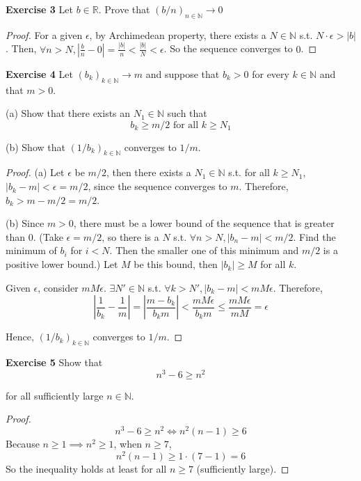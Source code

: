 \documentclass[12pt]{article}
\newcommand{\bbN}{\mathbb{N}}
\theoremstyle{definition}
\numberwithin{equation}{subsection}
\begin{document}
\textbf{Exercise 3} Let $b \in \mathbb{R} .$ Prove that $(b / n)_{n \in \mathbb{N}} \rightarrow 0$
\begin{proof}
For a given $\epsilon$, by Archimedean property, there exists a $N \in \bbN$ s.t. $N\cdot\epsilon > |b|$. Then, $\forall n > N, \left|\frac{b}{n} - 0\right|  = \frac{|b|}{n} < \frac{|b|}{N} < \epsilon$. So the sequence converges to $0$. 
\end{proof}


\textbf{Exercise 4} Let $\left(b_{k}\right)_{k \in \mathbb{N}} \rightarrow m$ and suppose that $b_{k}>0$ for every $k \in \mathbb{N}$ and that $m>0 .$

(a) Show that there exists an $N_{1} \in \mathbb{N}$ such that
$$
b_{k} \geq m / 2 \text { for all } k \geq N_{1}
$$

(b) Show that $\left(1 / b_{k}\right)_{k \in \mathbb{N}}$ converges to $1 / m$.
\begin{proof}
    (a) Let $\epsilon$ be $m/2$, then there exists a $N_1 \in \bbN$ s.t. for all $k \geq N_1$, $|b_k - m| < \epsilon = m/2$, since the sequence converges to $m$. Therefore, $b_k > m - m/2 = m/2$. 
    
    (b) Since $m > 0$, there must be a lower bound of the sequence that is greater than $0$. (Take $\epsilon = m/2$, so there is a $N$ s.t. $\forall n > N, |b_n - m| < m/2$. Find the minimum of $b_i$ for $i < N$. Then the smaller one of this minimum and $m/2$ is a positive lower bound.) Let $M$ be this bound, then $|b_k| 
    \geq M$ for all $k$. 
        
    Given $\epsilon$, consider $mM\epsilon $. $\exists N' \in \bbN $ s.t. $\forall k > N', |b_k - m| < mM\epsilon$. Therefore, $$
    \left|\frac{1}{b_k}-\frac{1}{m}\right| = \left|\frac{m-b_k}{b_km}\right| < \frac{mM\epsilon}{b_km} \leq \frac{mM\epsilon}{mM} =\epsilon
    $$

    Hence, $\left(1 / b_{k}\right)_{k \in \mathbb{N}}$ converges to $1 / m$.

\end{proof}


\textbf{Exercise 5} Show that
$$
n^3-6 \geq n^2
$$

for  all sufficiently large $n \in \bbN$. 
\begin{proof}
$$
n^3-6 \geq n^2 \Longleftrightarrow n^2(n-1) \geq 6
$$
Because $n\geq 1 \implies n^2 \geq  1$, when $n\geq 7$, 
$$
n^2(n-1) \geq 1\cdot(7-1) =6
$$
So the inequality holds at least for all $n \geq 7$ (sufficiently large).
\end{proof}
\end{document}
